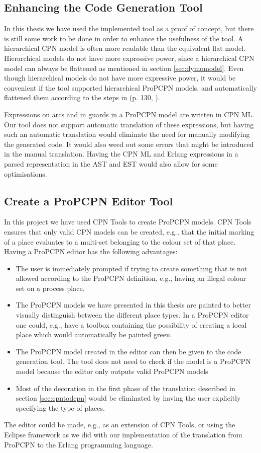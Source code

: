 \subsection{Enhancing the Code Generation Tool}
In this thesis we have used the implemented tool as a proof of concept, but there is still some work to be done in order to enhance the usefulness of the tool. A hierarchical CPN model is often more readable than the equivalent flat model. Hierarchical models do not have more expressive power, since a hierarchical CPN model can always be flattened as mentioned in section \ref{sec:dymomodel}. Even though hierarchical models do not have more expressive power, it would be convenient if the tool supported hierarchical ProPCPN models, and automatically flattened them according to the steps in (p. 130, \cite{RefWorks:87}).

Expressions on arcs and in guards in a ProPCPN model are written in CPN ML. Our tool does not support automatic translation of these expressions, but having such an automatic translation would eliminate the need for manually modifying the generated code. It would also weed out some errors that might be introduced in the manual translation. Having the CPN ML and Erlang expressions in a parsed representation in the AST and EST would also allow for some optimisations. 

\subsection{Create a ProPCPN Editor Tool}
In this project we have used CPN Tools to create ProPCPN models. CPN Tools ensures that only valid CPN models can be created, e.g., that the initial marking of a place evaluates to a multi-set belonging to the colour set of that place. Having a ProPCPN editor has the following advantages: 

\begin{itemize}
\item The user is immediately prompted if trying to create something that is not allowed according to the ProPCPN definition, e.g., having an illegal colour set on a process place.
\item The ProPCPN models we have presented in this thesis are painted to better visually distinguish between the different place types. In a ProPCPN editor one could, e.g., have a toolbox containing the possibility of creating a local place which would automatically be painted green.  
\item The ProPCPN model created in the editor can then be given to the code generation tool. The tool does not need to check if the model is a ProPCPN model because the editor only outputs valid ProPCPN models
\item Most of the decoration in the first phase of the translation described in section \ref{sec:cpntodcpn} would be eliminated by having the user explicitly specifying the type of places.
\end{itemize}

The editor could be made, e.g., as an extension of CPN Tools, or using the Eclipse framework as we did with our implementation of the translation from ProPCPN to the Erlang programming language.
